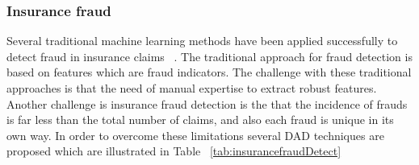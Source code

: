 \subsubsection{Insurance fraud}
Several traditional machine learning methods have been applied successfully to detect fraud in insurance claims ~\cite{joudaki2015using,roy2017detecting}. The traditional approach for fraud detection is based on features which are fraud indicators. The challenge with these traditional approaches is that the need of manual expertise to extract robust features. Another challenge is insurance fraud detection is the that the incidence of frauds is far less than the total number of claims, and also each fraud is unique in its own way. In order to overcome these limitations several DAD techniques are proposed which are illustrated in Table ~\ref{tab:insurancefraudDetect}

\begin{table}
\begin{center}
  \caption{Examples of DAD techniques used in insurance fraud detection.
          \\DBN: Deep Belief Networks, DNN : Deep Neural Networks
          \\CNN: Convolutional Neural Networks,VAE: Variational Autoencoders
          \\GAN: Generative Adversarial Networks}
  \label{tab:insurancefraudDetect}
  \captionsetup{justification=centering}
\end{center}
\end{table}
